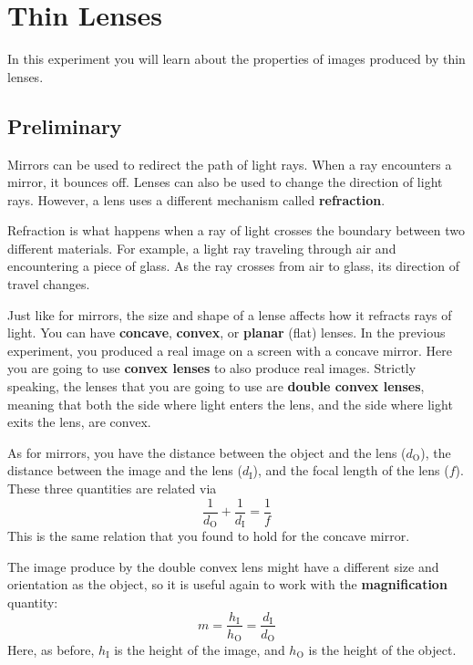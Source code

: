 \setcounter{chapter}{6}
\chapter{Thin Lenses}
%
In this experiment you will learn about the properties of images produced by thin lenses.
%
\section{Preliminary}
%
Mirrors can be used to redirect the path of light rays. When a ray encounters a mirror, it bounces off. Lenses can also be used to change the direction of light rays. However, a lens uses a different mechanism called \textbf{refraction}.

Refraction is what happens when a ray of light crosses the boundary between two different materials. For example, a light ray traveling through air and encountering a piece of glass. As the ray crosses from air to glass, its direction of travel changes.

Just like for mirrors, the size and shape of a lense affects how it refracts rays of light. You can have \textbf{concave}, \textbf{convex}, or \textbf{planar} (flat) lenses. In the previous experiment, you produced a real image on a screen with a concave mirror. Here you are going to use \textbf{convex lenses} to also produce real images. Strictly speaking, the lenses that you are going to use are \textbf{double convex lenses}, meaning that both the side where light enters the lens, and the side where light exits the lens, are convex.

As for mirrors, you have the distance between the object and the lens ($d_{\text{O}}$), the distance between the image and the lens ($d_{\text{I}}$), and the focal length of the lens ($f$). These three quantities are related via
\begin{equation}
    \frac{1}{d_{\text{O}}} + \frac{1}{d_{\text{I}}} = \frac{1}{f}
\end{equation}
This is the same relation that you found to hold for the concave mirror.

The image produce by the double convex lens might have a different size and orientation as the object, so it is useful again to work with the \textbf{magnification} quantity:
\begin{equation}
    m = \frac{h_{\text{I}}}{h_{\text{O}}} = \frac{d_{\text{I}}}{d_{\text{O}}}
\end{equation}
Here, as before, $h_{\text{I}}$ is the height of the image, and $h_{\text{O}}$ is the height of the object.
%
